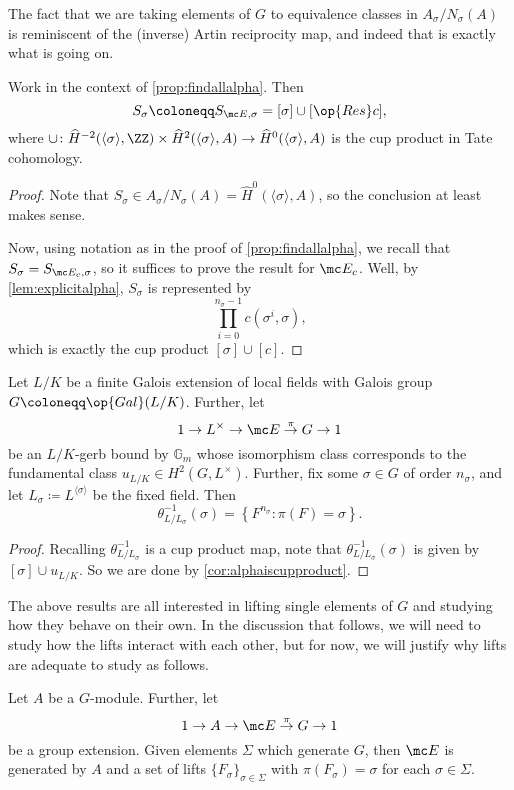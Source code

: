The fact that we are taking elements of $ G$ to equivalence classes in $A_\sigma/N_\sigma\left(A\right)$ is reminiscent of the (inverse) Artin reciprocity map, and indeed that is exactly what is going on.
\begin{cor} \label{cor:alphaiscupproduct}
	Work in the context of \autoref{prop:findallalpha}. Then
	\[S_\sigma\coloneqq S_{\mc E,\sigma}=[\sigma]\cup[\op{Res}c],\]
	where $\cup\colon\widehat H^{-2}(\langle\sigma\rangle,\ZZ)\times\widehat H^2(\langle\sigma\rangle,A)\to\widehat H^0(\langle\sigma\rangle,A)$ is the cup product in Tate cohomology.
\end{cor}
\begin{proof}
	Note that $S_\sigma\in A_\sigma/N_\sigma(A)=\widehat H^0(\langle\sigma\rangle,A)$, so the conclusion at least makes sense.
	
	Now, using notation as in the proof of \autoref{prop:findallalpha}, we recall that $S_\sigma=S_{\mc E_c,\sigma}$, so it suffices to prove the result for $\mc E_c$. Well, by \autoref{lem:explicitalpha}, $S_\sigma$ is represented by
	\[\prod_{i=0}^{n_\sigma-1}c\left(\sigma^i,\sigma\right),\]
	which is exactly the cup product $[\sigma]\cup[c]$.
\end{proof}
\begin{cor}
	Let $L/K$ be a finite Galois extension of local fields with Galois group $ G\coloneqq\op{Gal}(L/K)$. Further, let
	\[1\to L^\times\to\mc E\stackrel\pi\to G\to1\]
	be an $L/K$-gerb bound by $\mathbb G_m$ whose isomorphism class corresponds to the fundamental class $u_{L/K}\in H^2( G,L^\times)$. Further, fix some $\sigma\in G$ of order $n_\sigma$, and let $L_\sigma\coloneqq L^{\langle\sigma\rangle}$ be the fixed field. Then
	\[\theta_{L/L_\sigma}^{-1}(\sigma)=\left\{F^{n_\sigma}:\pi(F)=\sigma\right\}.\]
\end{cor}
\begin{proof}
	Recalling $\theta_{L/L_\sigma}^{-1}$ is a cup product map, note that $\theta_{L/L_\sigma}^{-1}(\sigma)$ is given by $[\sigma]\cup u_{L/K}$. So we are done by \autoref{cor:alphaiscupproduct}.
\end{proof}
The above results are all interested in lifting single elements of $ G$ and studying how they behave on their own. In the discussion that follows, we will need to study how the lifts interact with each other, but for now, we will justify why lifts are adequate to study as follows.
\begin{proposition} \label{prop:liftsgenerate}
	Let $A$ be a $ G$-module. Further, let
	\[1\to A\to\mc E\stackrel\pi\to G\to1\]
	be a group extension. Given elements $\Sigma$ which generate $ G$, then $\mc E$ is generated by $A$ and a set of lifts $\{F_\sigma\}_{\sigma\in\Sigma}$ with $\pi(F_\sigma)=\sigma$ for each $\sigma\in\Sigma$.
\end{proposition}
